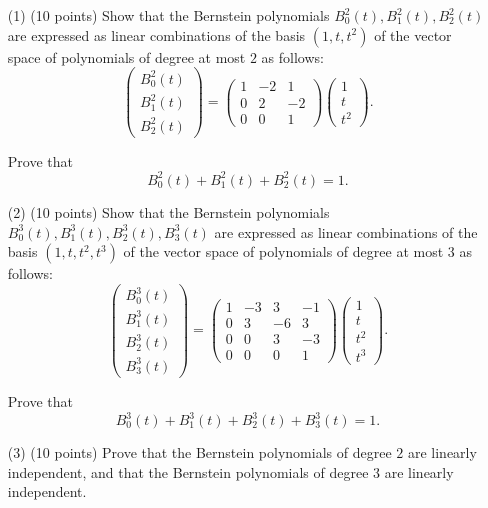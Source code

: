\documentclass[12pt]{article}
\begin{document}
\begin{itemize}
 \item[(1)](10 points)
Show that the Bernstein polynomials $B_0^2(t), B_1^2(t), B_2^2(t)$
are expressed as linear combinations of the basis
$(1, t, t^2)$ of the vector space of polynomials of degree at most $2$ 
as follows:
\[
\begin{pmatrix}
B_0^2(t)\\
B_1^2(t)\\
B_2^2(t)
\end{pmatrix} = 
\begin{pmatrix}
1 & -2  & 1 \\
0 &  2  & -2 \\
0 &  0  & 1  
\end{pmatrix} 
\begin{pmatrix}
1 \\
t \\
t^2
\end{pmatrix}. 
\]

Prove that
\[
B_0^2(t) +  B_1^2(t) +  B_2^2(t) = 1.
\]

\item[(2)](10 points)
Show that the Bernstein polynomials $B_0^3(t), B_1^3(t), B_2^3(t), B_3^3(t)$
are expressed as linear combinations of the basis
$(1, t, t^2, t^3)$ of the vector space of polynomials of degree at most $3$ 
as follows:
\[
\begin{pmatrix}
B_0^3(t)\\
B_1^3(t)\\
B_2^3(t) \\
B_3^3(t) 
\end{pmatrix} = 
\begin{pmatrix}
1 & -3  & 3 & -1 \\
0 &  3  & -6 & 3 \\
0 &  0  & 3  & -3 \\
0 &  0  & 0  & 1
\end{pmatrix} 
\begin{pmatrix}
1 \\
t \\
t^2\\
t^3
\end{pmatrix}. 
\]

Prove that
\[
B_0^3(t) +  B_1^3(t) +  B_2^3(t) + B_3^3(t) = 1.
\]

\item[(3)](10 points)
Prove that the Bernstein polynomials of degree $2$
are linearly independent, and that
the Bernstein polynomials of degree $3$
are linearly independent.
 \end{itemize}
\end{document}

